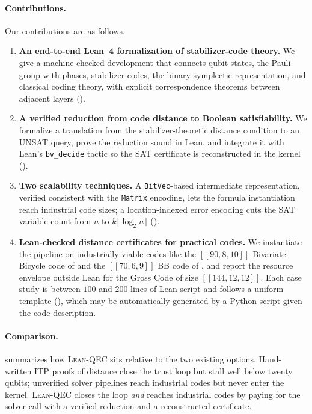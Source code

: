 \paragraph{Contributions.} Our contributions are as follows.
\begin{enumerate}[leftmargin=1.5em]
  \item \textbf{An end-to-end Lean~4 formalization of stabilizer-code theory.}
  We give a machine-checked development that connects qubit states, the Pauli
  group with phases, stabilizer codes, the binary symplectic representation, and
  classical coding theory, with explicit correspondence theorems between
  adjacent layers ().

  \item \textbf{A verified reduction from code distance to Boolean
  satisfiability.} We formalize a translation from the stabilizer-theoretic
  distance condition to an UNSAT query, prove the reduction sound in Lean, and
  integrate it with Lean's \lstinline{bv_decide} tactic so the SAT certificate
  is reconstructed in the kernel ().

  \item \textbf{Two scalability techniques.} A \lstinline{BitVec}-based
  intermediate representation, verified consistent with the \lstinline{Matrix}
  encoding, lets the formula instantiation reach industrial code sizes; a
  location-indexed error encoding cuts the SAT variable count from $n$ to
  $k\lceil\log_2 n\rceil$ ().

  \item \textbf{Lean-checked distance certificates for practical codes.} We
  instantiate the pipeline on industrially viable codes like the $[[90,8,10]]$ Bivariate Bicycle code of \cite{bravyi2024} and the $[[70, 6, 9]]$ BB code of \cite{tripier2026faulttolerantquantumcomputingtrapped}, and report the
  resource envelope outside Lean for the Gross Code of size $[[144,12,12]]$. Each case study is between
  $100$ and $200$ lines of Lean script and follows a uniform template
  (), which may be automatically generated by a Python script given the code description.
\end{enumerate}

\paragraph{Comparison.}  summarizes how \textsc{Lean-QEC}
sits relative to the two existing options. Hand-written ITP proofs of distance
close the trust loop but stall well below twenty qubits; unverified solver
pipelines reach industrial codes but never enter the kernel. \textsc{Lean-QEC}
closes the loop \emph{and} reaches industrial codes by paying for the solver
call with a verified reduction and a reconstructed certificate.

